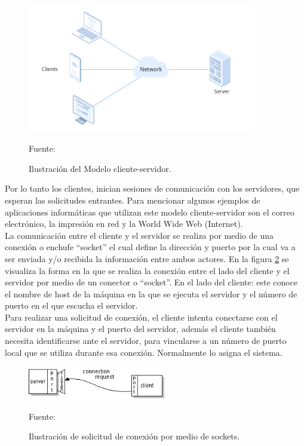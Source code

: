 \begin{figure}[H]
    \begin{center}
        \includegraphics[width=10cm]{img/capitulo_2/client-server.jpeg}
    \end{center}
    \begin{center}
        \caption{Ilustración del Modelo cliente-servidor.}
        Fuente: \cite{clientserver}
        \label{fig:client_server}
    \end{center}
\end{figure}

Por lo tanto los clientes, inician sesiones de comunicación con los servidores, que esperan las solicitudes entrantes. Para mencionar algunos ejemplos de aplicaciones informáticas que utilizan este modelo cliente-servidor son el correo electrónico, la impresión en red y la World Wide Web (Internet).\\

La comunicación entre el cliente y el servidor se realiza por medio de una conexión o enchufe ``socket'' el cual define la dirección y puerto por la cual va a ser enviada y/o recibida la información entre ambos actores. En la figura \ref{fig:socket_request} se visualiza la forma en la que se realiza la conexión entre el lado del cliente y el servidor por medio de un conector o ``socket''. En el lado del cliente: este conoce el nombre de host de la máquina en la que se ejecuta el servidor y el número de puerto en el que escucha el servidor.\\

Para realizar una solicitud de conexión, el cliente intenta conectarse con el servidor en la máquina y el puerto del servidor, además el cliente también necesita identificarse ante el servidor, para vincularse a un número de puerto local que se utiliza durante esa conexión. Normalmente lo asigna el sistema.\\

\begin{figure}[H]
    \begin{center}
        \includegraphics[width=6cm]{img/capitulo_2/socket_request.jpg}
    \end{center}
    \begin{center}
        \caption{Ilustración de solicitud de conexión por medio de sockets.}
        Fuente: \cite{socketconnection}
        \label{fig:socket_request}
    \end{center}
\end{figure}

